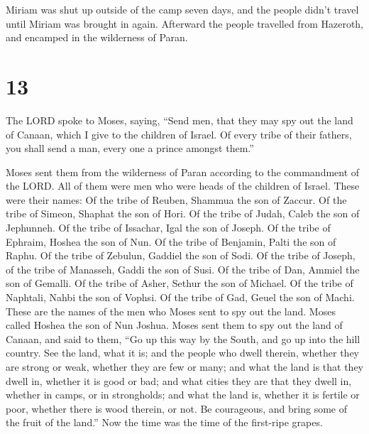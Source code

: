  Miriam was shut up outside of the camp seven days, and
the people didn't travel until Miriam was brought in again.
 Afterward the people travelled from Hazeroth, and
encamped in the wilderness of Paran.

\hypertarget{section-12}{%
\section{13}\label{section-12}}

 The LORD spoke to Moses, saying,  ``Send
men, that they may spy out the land of Canaan, which I give to the
children of Israel. Of every tribe of their fathers, you shall send a
man, every one a prince amongst them.''

 Moses sent them from the wilderness of Paran according to
the commandment of the LORD. All of them were men who were heads of the
children of Israel.  These were their names: Of the tribe
of Reuben, Shammua the son of Zaccur.  Of the tribe of
Simeon, Shaphat the son of Hori.  Of the tribe of Judah,
Caleb the son of Jephunneh.  Of the tribe of Issachar,
Igal the son of Joseph.  Of the tribe of Ephraim, Hoshea
the son of Nun.  Of the tribe of Benjamin, Palti the son
of Raphu.  Of the tribe of Zebulun, Gaddiel the son of
Sodi.  Of the tribe of Joseph, of the tribe of Manasseh,
Gaddi the son of Susi.  Of the tribe of Dan, Ammiel the
son of Gemalli.  Of the tribe of Asher, Sethur the son of
Michael.  Of the tribe of Naphtali, Nahbi the son of
Vophsi.  Of the tribe of Gad, Geuel the son of Machi.
 These are the names of the men who Moses sent to spy out
the land. Moses called Hoshea the son of Nun Joshua. 
Moses sent them to spy out the land of Canaan, and said to them, ``Go up
this way by the South, and go up into the hill country. 
See the land, what it is; and the people who dwell therein, whether they
are strong or weak, whether they are few or many;  and
what the land is that they dwell in, whether it is good or bad; and what
cities they are that they dwell in, whether in camps, or in strongholds;
 and what the land is, whether it is fertile or poor,
whether there is wood therein, or not. Be courageous, and bring some of
the fruit of the land.'' Now the time was the time of the first-ripe
grapes.

